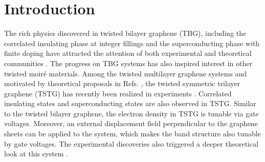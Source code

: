 \documentclass[prb,aps,nofootinbib,amssymb,twocolumn,superscriptaddress,10pt]{revtex4-2}
\begin{document}
\maketitle

\section{Introduction}

The rich physics discovered in twisted bilayer graphene (TBG), including the correlated insulating phase at integer fillings and the superconducting phase with finite doping have attracted the attention of both experimental and theoretical communities \cite{LOP07,SUA10,BIS11,CAO18,CAO18a,CAO20,CAO20,CHE20a,LIU20a,LU19,LU20,PAR20a,POL19,SAI20,SAI21,SER20,STE20,WU20a,YAN19,CHO19,CHO20,KER19,NUC20,WON20,XIE19,JIA19,CHO21,KAN19,SEO19,BUL20,HEJ20,FER21,FER20,VEN18,POT21,ABO20,AHN19,BER20,BER20a,BER20b,BUL20a,CAO20b,CEA20,CHR20,CLA19,DA19,DA20,DAI16,DOD18,EFI18,EUG20,GON19,GUI18,GUO18,HEJ19,HEJ19a,HUA19,HUA20a,ISO18,JAI16,JUL20,KAN18,KAN20a,KEN18,KHA20,KON20,KOS18,LED20,LEW20,LIA19,LIA20,LIA20a,LIU12,LIU18,LIU19,LIU21,LIU21a,OCH18,PAD20,PEL18,PO18,PO19,REP20,REP20a,ROY19,SOE20,SON19,SON20b,TAR19,THO18,UCH14,VAF20,VEN18,WAN20,WIJ15,WIL20,WU18,WU19,WU19a,WU20b,XIE20,XIE20a,XIE20c,XIE20d,XU18,XU18b,YOU19,YUA18,ZHA20,ZOU18,KWAN2021, ZHANG2021QMC, Lee2021QMC}.
The progress on TBG systems has also inspired interest in other twisted moir\'e materials. 
Among the twisted multilayer graphene systems and motivated by theoretical proposals in Refs. \cite{SUA13,KHA19,MOR19,LI19,LOP20,CAR20,PAR20b,ZHU20,LEI20,WU20c}, the twisted symmetric trilayer graphene (TSTG) has recently been realized in experiments \cite{HAO20,PAR20,CAO21}. Correlated insulating states and superconducting states are also observed in TSTG. Similar to the twisted bilayer graphene, the electron density in TSTG is tunable via gate voltages. Moreover, an external displacement field perpendicular to the graphene sheets can be applied to the system, which makes the band structure also tunable by gate voltages. The experimental discoveries also triggered a deeper theoretical look at this system \cite{TSTGI,SHIN21,FIS21,ETHAN2021,QIN2021,CHOU2021}.
\end{document}
